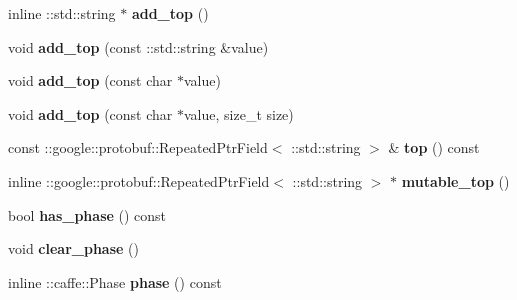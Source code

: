 \begin{DoxyCompactItemize}
\mbox{\label{classcaffe_1_1_layer_parameter_ae8ae62972100b82c253a03df94848d34}} 
inline \+::std\+::string $\ast$ {\bfseries add\+\_\+top} ()
\item 
\mbox{\label{classcaffe_1_1_layer_parameter_ab755055ee8c0f8f9476bd8cdacccdf35}} 
void {\bfseries add\+\_\+top} (const \+::std\+::string \&value)
\item 
\mbox{\label{classcaffe_1_1_layer_parameter_a9ea29a44735343c893aceca46afb7613}} 
void {\bfseries add\+\_\+top} (const char $\ast$value)
\item 
\mbox{\label{classcaffe_1_1_layer_parameter_aaf1b8be9e70faaf90376f490b1cfa60a}} 
void {\bfseries add\+\_\+top} (const char $\ast$value, size\+\_\+t size)
\item 
\mbox{\label{classcaffe_1_1_layer_parameter_ad3f6890620834680074ffb9c1e46def1}} 
const \+::google\+::protobuf\+::\+Repeated\+Ptr\+Field$<$ \+::std\+::string $>$ \& {\bfseries top} () const
\item 
\mbox{\label{classcaffe_1_1_layer_parameter_ab93e20ac77f5dc80eddd5759b0944664}} 
inline \+::google\+::protobuf\+::\+Repeated\+Ptr\+Field$<$ \+::std\+::string $>$ $\ast$ {\bfseries mutable\+\_\+top} ()
\item 
\mbox{\label{classcaffe_1_1_layer_parameter_a9512cf98cc8d4017d6ffb38af431442f}} 
bool {\bfseries has\+\_\+phase} () const
\item 
\mbox{\label{classcaffe_1_1_layer_parameter_a0af175bd7915484b0941a26bd28f00e6}} 
void {\bfseries clear\+\_\+phase} ()
\item 
\mbox{\label{classcaffe_1_1_layer_parameter_a1f10b5f5be94828bcc103ac444a20572}} 
inline \+::caffe\+::\+Phase {\bfseries phase} () const
\item 
\mbox{\label{classcaffe_1_1_layer_parameter_a1da6508b7c5e2a39907cf08872b6a3d8}} 

\end{DoxyCompactItemize}
